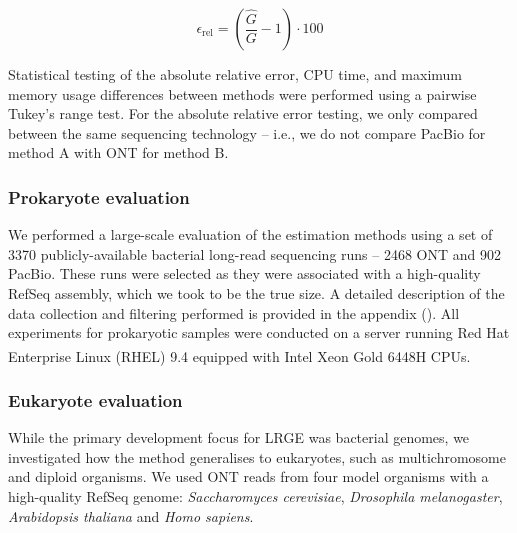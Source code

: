 \documentclass[unnumsec,webpdf,modern,large]{oup-authoring-template}
\theoremstyle{thmstyleone}%
\theoremstyle{thmstyletwo}%
\theoremstyle{thmstylethree}%
\newcommand{\lrge}{LRGE}
\begin{document}
\begin{equation}\label{eq:rel_err}
    \epsilon_{\text{rel}} = \left( \frac{\hat{G}}{G} - 1 \right) \cdot 100
\end{equation}

Statistical testing of the absolute relative error, CPU time, and maximum memory usage differences between methods were performed using a pairwise Tukey's range test. For the absolute relative error testing, we only compared between the same sequencing technology -- i.e., we do not compare PacBio for method A with ONT for method B.


\subsubsection{Prokaryote evaluation}
\label{sec:prok}

We performed a large-scale evaluation of the estimation methods using a set of 3370 publicly-available bacterial long-read sequencing runs -- 2468 ONT and 902 PacBio. These runs were selected as they were associated with a high-quality RefSeq assembly, which we took to be the true size. A detailed description of the data collection and filtering performed is provided in the appendix ().
All experiments for prokaryotic samples were conducted on a server running Red Hat Enterprise Linux (RHEL) 9.4 equipped with Intel\textsuperscript{\tiny{\textregistered}} Xeon\textsuperscript{\tiny{\textregistered}} Gold 6448H CPUs. 

\subsubsection{Eukaryote evaluation}
\label{sec:methods_euk}

While the primary development focus for \lrge{} was bacterial genomes, we investigated how the method generalises to eukaryotes, such as multichromosome and diploid organisms. We used ONT reads from four model organisms with a high-quality RefSeq genome: \textit{Saccharomyces cerevisiae}, \textit{Drosophila melanogaster}, \textit{Arabidopsis thaliana} and \textit{Homo sapiens}.
\end{document}
